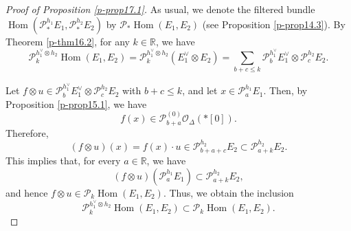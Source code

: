 \documentclass[12pt,twoside]{amsart}
\DeclareMathOperator{\Hom}{Hom}
\theoremstyle{definition}
\begin{document}
\begin{proof}[Proof of Proposition \ref{p-prop17.1}]
As usual, we denote the filtered bundle 
\(\Hom(\mathcal{P}^{h_1}_\ast E_1, \mathcal{P}^{h_2}_\ast E_2)\) 
by \( \mathcal{P}_\ast \Hom(E_1, E_2) \) (see Proposition \ref{p-prop14.3}). 
By Theorem \ref{p-thm16.2}, for any \( k \in \mathbb{R} \), we have
\[
\mathcal{P}^{h_1^\vee \otimes h_2}_k \Hom(E_1, E_2)
= \mathcal{P}^{h_1^\vee \otimes h_2}_k (E_1^\vee \otimes E_2)
= \sum_{b + c \leq k} \mathcal{P}^{h_1^\vee}_b E_1^\vee \otimes \mathcal{P}^{h_2}_c E_2.
\]

Let \( f \otimes u \in \mathcal{P}^{h_1^\vee}_b E_1^\vee 
\otimes \mathcal{P}^{h_2}_c E_2 \) with \( b + c \leq k \), and 
let \( x \in \mathcal{P}^{h_1}_a E_1 \).  
Then, by Proposition \ref{p-prop15.1}, we have  
\[
f(x) \in \mathcal{P}^{(0)}_{b + a} \mathcal{O}_\Delta(*[0]).
\]  
Therefore,
\[
(f \otimes u)(x) = f(x) \cdot u \in 
\mathcal{P}^{h_2}_{b + a + c} E_2 \subset \mathcal{P}^{h_2}_{a + k} E_2.
\]
This implies that, for every \( a \in \mathbb{R} \), we have  
\[
(f \otimes u)(\mathcal{P}^{h_1}_a E_1) \subset \mathcal{P}^{h_2}_{a + k} E_2,
\]
and hence \( f \otimes u \in \mathcal{P}_k \Hom(E_1, E_2) \).  
Thus, we obtain the inclusion
\[
\mathcal{P}^{h_1^\vee \otimes h_2}_k \Hom(E_1, E_2)
\subset \mathcal{P}_k \Hom(E_1, E_2).
\]


\end{proof}
\end{document}
